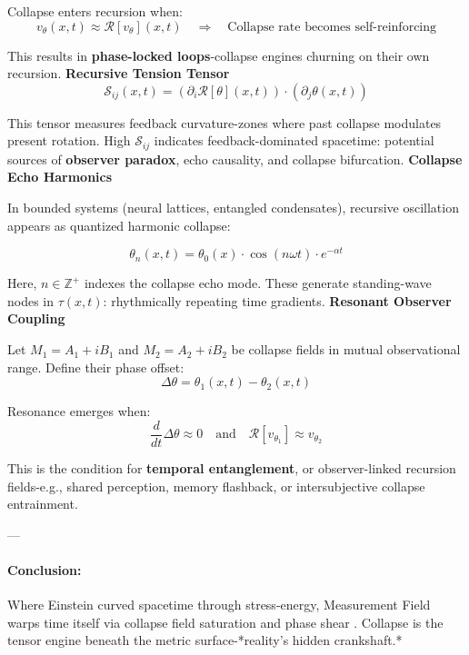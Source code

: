   Collapse enters recursion when:
  \[
  v_\theta(x, t) \approx \mathcal{R}[v_\theta](x, t)
  \quad \Rightarrow \quad
  \text{Collapse rate becomes self-reinforcing}
  \]
  
  This results in \textbf{phase-locked loops}-collapse engines churning on their own recursion. \cite{chapter_time} \vspace{1em}
  \textbf{Recursive Tension Tensor}
  \[
  \mathcal{S}_{ij}(x,t) = \left( \partial_i \mathcal{R}[\theta](x,t) \right) \cdot \left( \partial_j \theta(x,t) \right)
  \]
  
  This tensor measures feedback curvature-zones where past collapse modulates present rotation. \cite{chapter_time} High $\mathcal{S}_{ij}$ indicates feedback-dominated spacetime: potential sources of \textbf{observer paradox}, echo causality, and collapse bifurcation. \cite{chapter_time} \vspace{1em}
  \textbf{Collapse Echo Harmonics}
  
  In bounded systems (neural lattices, entangled condensates), recursive oscillation appears as quantized harmonic collapse:
  
  \[
  \theta_n(x,t) = \theta_0(x) \cdot \cos(n \omega t) \cdot e^{-\alpha t}
  \]
  
  Here, $n \in \mathbb{Z}^+$ indexes the collapse echo mode. \cite{chapter_time} These generate standing-wave nodes in $\tau(x,t)$: rhythmically repeating time gradients. \cite{chapter_time} \vspace{1em}
  \textbf{Resonant Observer Coupling}
  
  Let $M_1 = A_1 + iB_1$ and $M_2 = A_2 + iB_2$ be collapse fields in mutual observational range. \cite{chapter_time} Define their phase offset:
  \[
  \Delta\theta = \theta_1(x,t) - \theta_2(x,t)
  \]
  
  Resonance emerges when:
  \[
  \frac{d}{dt} \Delta\theta \approx 0 \quad \text{and} \quad \mathcal{R}[v_{\theta_1}] \approx v_{\theta_2}
  \]
  
  This is the condition for \textbf{temporal entanglement}, or observer-linked recursion fields-e.g., shared perception, memory flashback, or intersubjective collapse entrainment.
  

---

\paragraph{Conclusion:}

Where Einstein curved spacetime through stress-energy, Measurement Field warps time itself via collapse field saturation and phase shear . \cite{chapter_time} Collapse is the tensor engine beneath the metric surface-*reality’s hidden crankshaft.*

